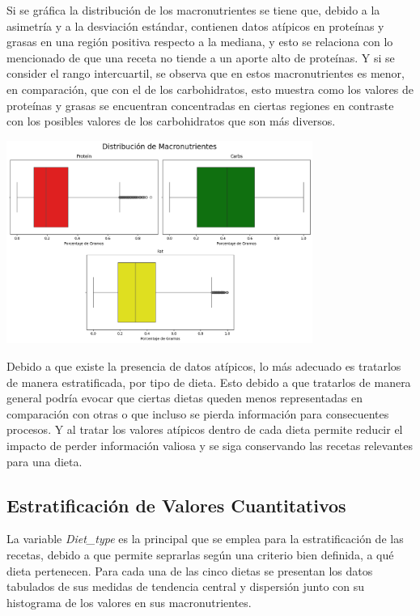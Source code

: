 \documentclass[12pt,a4paper]{article}
\begin{document}
        Si se gráfica la distribución de los macronutrientes se tiene que, debido 
        a la asimetría y a la desviación estándar, contienen datos atípicos en proteínas y grasas en una región 
        positiva respecto a la mediana, y esto se relaciona con lo mencionado de que 
        una receta no tiende a un aporte alto de proteínas. Y si se consider el rango 
        intercuartil, se observa que en estos macronutrientes es menor, en comparación, 
        que con el de los carbohidratos, esto muestra como los valores de proteínas y 
        grasas se encuentran concentradas en ciertas regiones en contraste con los posibles 
        valores de los carbohidratos que son más diversos.
        
        \begin{center}
            \includegraphics[width=0.75\textwidth]{Resources/2_02_plot_01.png}
        \end{center}

        Debido a que existe la presencia de datos atípicos, lo más adecuado es tratarlos 
        de manera estratificada, por tipo de dieta. Esto debido a que tratarlos de manera 
        general podría evocar que ciertas dietas queden menos representadas en comparación 
        con otras o que incluso se pierda información para consecuentes procesos. Y al 
        tratar los valores atípicos dentro de cada dieta permite reducir el impacto de 
        perder información valiosa y se siga conservando las recetas relevantes para una dieta.

    \subsection{Estratificación de Valores Cuantitativos}

        La variable \emph{Diet\_type} es la principal que se emplea para la 
        estratificación de las recetas, debido a que permite seprarlas 
        según una criterio bien definida, a qué dieta pertenecen. Para cada 
        una de las cinco dietas se presentan los datos tabulados de sus 
        medidas de tendencia central y dispersión junto con su histograma 
        de los valores en sus macronutrientes.\\
\end{document}
